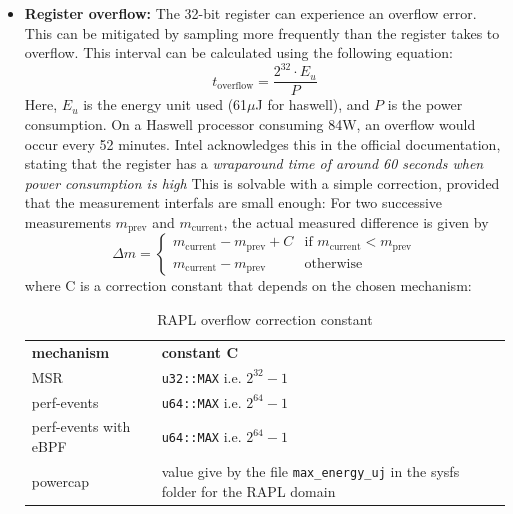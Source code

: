 \begin{itemize}
    \item \textbf{Register overflow: }The 32-bit register can experience an overflow error\parencite{khan2018rapl, raffin2024dissecting}. This can be mitigated by sampling more frequently than the register takes to overflow. This interval can be calculated using the following equation: 
    \begin{equation}
        t_{\text{overflow}} = \frac{2^{32} \cdot E_u}{P}
    \end{equation}
    Here, $E_u$ is the energy unit used (61$\mu$J for haswell), and $P$ is the power consumption. On a Haswell processor consuming 84W, an overflow would occur every 52 minutes. Intel acknowledges this in the official documentation, stating that the register has a \textit{wraparound time of around 60 seconds when power consumption is high}\parencite{intel-sdm}
    This is solvable with a simple correction, provided that the measurement interfals are small enough: For two successive measurements $m_{\text{prev}}$ and $m_{\text{current}}$, the actual measured difference is given by
    \begin{equation}
        \Delta m =
        \begin{cases}
        m_{\text{current}} - m_{\text{prev}} + C & \text{if } m_{\text{current}} < m_{\text{prev}} \\
        m_{\text{current}} - m_{\text{prev}} & \text{otherwise}
        \end{cases}
    \end{equation}
    where C is a correction constant that depends on the chosen mechanism:
    
    \begin{table}[h]
        \small
        \begin{tabular}{|p{4cm}|p{9cm}|}
            \hline
            \textbf{mechanism} & \textbf{constant C}\\
            \Xhline{1.5pt}
            MSR & \texttt{u32::MAX} i.e. $2^{32} - 1$\\
            \hline
            perf-events & \texttt{u64::MAX} i.e. $2^{64} - 1$\\
            \hline
            perf-events with eBPF & \texttt{u64::MAX} i.e. $2^{64} - 1$\\
            \hline
            powercap & value give by the file \texttt{max\_energy\_uj} in the sysfs folder for the RAPL domain\\
            \hline
        \end{tabular}
        \caption[RAPL overflow correction constant]{RAPL overflow correction constant}
        \label{tab:RAPL_overflow_correction_constant}
    \end{table}


\end{itemize}
